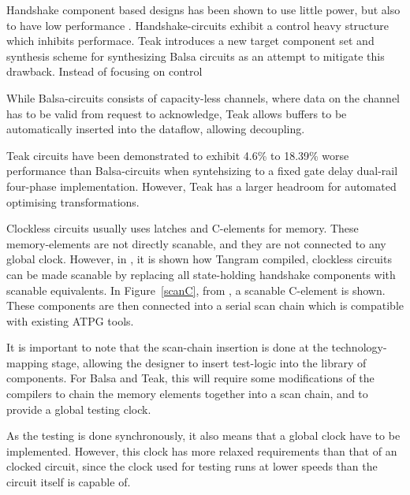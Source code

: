Handshake component based designs has been shown to use little power,
but also to have low performance \cite{80c51}. Handshake-circuits
exhibit a control heavy structure which inhibits performace. Teak
\cite{teak} introduces a new target component set and synthesis scheme
for synthesizing Balsa circuits as an attempt to mitigate this
drawback. Instead of focusing on control

While Balsa-circuits consists of capacity-less channels, where data on
the channel has to be valid from request to acknowledge, Teak allows
buffers to be automatically inserted into the dataflow, allowing
decoupling. 

Teak circuits have been demonstrated to exhibit 4.6\% to 18.39\% worse
performance than Balsa-circuits when syntehsizing to a fixed gate
delay dual-rail four-phase implementation. However, Teak has a larger
headroom for automated optimising transformations.


Clockless circuits usually uses latches and C-elements for
memory. These memory-elements are not directly scanable, and they are
not connected to any global clock. However, in \cite{fullscan}, it is
shown how Tangram compiled, clockless circuits can be made scanable by
replacing all state-holding handshake components with scanable
equivalents. In Figure~\ref{scanC}, from \cite{fullscan}, a scanable
C-element is shown. These components are then connected into a serial
scan chain which is compatible with existing ATPG tools.

It is important to note that the scan-chain insertion is done at the
technology-mapping stage, allowing the designer to insert test-logic
into the library of components. For Balsa and Teak, this will require
some modifications of the compilers to chain the memory elements
together into a scan chain, and to provide a global testing clock.

As the testing is done synchronously, it also means that a global
clock have to be implemented. However, this clock has more relaxed
requirements than that of an clocked circuit, since the clock used for
testing runs at lower speeds than the circuit itself is capable of.

